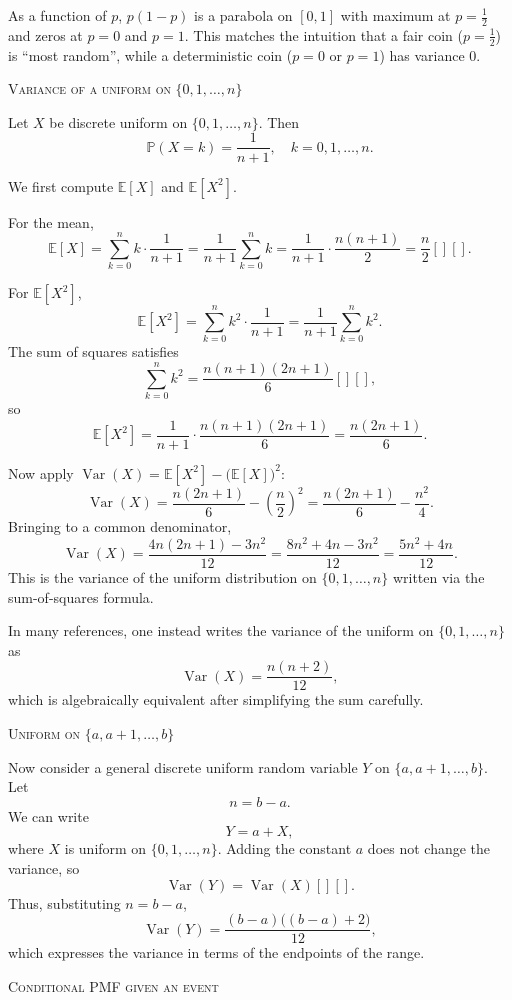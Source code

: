 As a function of \(p\), \(p(1-p)\) is a parabola on \([0,1]\) with maximum at \(p=\tfrac12\) and zeros at \(p=0\) and \(p=1\). 
This matches the intuition that a fair coin (\(p=\tfrac12\)) is “most random”, while a deterministic coin (\(p=0\) or \(p=1\)) has variance \(0\).

\bigskip\textsc{Variance of a uniform on \(\{0,1,\dots,n\}\)}

Let \(X\) be discrete uniform on \(\{0,1,\dots,n\}\).  
Then
\[
\mathbb{P}(X=k) = \frac{1}{n+1}, \quad k=0,1,\dots,n.
\]

We first compute \(\mathbb{E}[X]\) and \(\mathbb{E}[X^2]\).

For the mean,
\[
\mathbb{E}[X]
= \sum_{k=0}^{n} k \cdot \frac{1}{n+1}
= \frac{1}{n+1} \sum_{k=0}^{n} k
= \frac{1}{n+1} \cdot \frac{n(n+1)}{2}
= \frac{n}{2} [][].
\]

For \(\mathbb{E}[X^2]\),
\[
\mathbb{E}[X^2]
= \sum_{k=0}^{n} k^2 \cdot \frac{1}{n+1}
= \frac{1}{n+1} \sum_{k=0}^{n} k^2.
\]
The sum of squares satisfies
\[
\sum_{k=0}^{n} k^2 = \frac{n(n+1)(2n+1)}{6} [][],
\]
so
\[
\mathbb{E}[X^2]
= \frac{1}{n+1} \cdot \frac{n(n+1)(2n+1)}{6}
= \frac{n(2n+1)}{6}.
\]

Now apply \(\operatorname{Var}(X) = \mathbb{E}[X^2] - \bigl(\mathbb{E}[X]\bigr)^2\):
\[
\operatorname{Var}(X)
= \frac{n(2n+1)}{6} - \left(\frac{n}{2}\right)^2
= \frac{n(2n+1)}{6} - \frac{n^2}{4}.
\]
Bringing to a common denominator,
\[
\operatorname{Var}(X)
= \frac{4n(2n+1) - 3n^2}{12}
= \frac{8n^2 + 4n - 3n^2}{12}
= \frac{5n^2 + 4n}{12}.
\]
This is the variance of the uniform distribution on \(\{0,1,\dots,n\}\) written via the sum-of-squares formula.

In many references, one instead writes the variance of the uniform on \(\{0,1,\dots,n\}\) as
\[
\operatorname{Var}(X) = \frac{n(n+2)}{12},
\]
which is algebraically equivalent after simplifying the sum carefully. 

\bigskip\textsc{Uniform on \(\{a,a+1,\dots,b\}\)}

Now consider a general discrete uniform random variable \(Y\) on \(\{a,a+1,\dots,b\}\).  
Let
\[
n = b-a.
\]
We can write
\[
Y = a + X,
\]
where \(X\) is uniform on \(\{0,1,\dots,n\}\).  
Adding the constant \(a\) does not change the variance, so
\[
\operatorname{Var}(Y) = \operatorname{Var}(X) [][].
\]
Thus, substituting \(n = b-a\),
\[
\operatorname{Var}(Y)
= \frac{(b-a)\bigl((b-a)+2\bigr)}{12},
\]
which expresses the variance in terms of the endpoints of the range. 


\newpage
\bigskip\textsc{Conditional PMF given an event}

